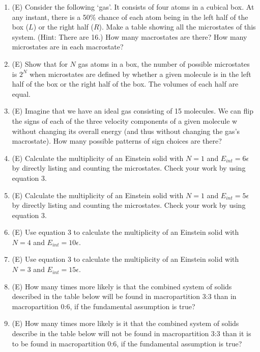 \begin{enumerate}

\item(E) Consider the following `gas'.
It consists of four atoms in a cubical box. At any instant, there is a 50\% chance
of each atom being in the left half of the box ($L$) or the right half ($R$).
Make a table showing all the microstates of this system. (Hint: There are 16.)
How many macrostates are there?
How many microstates are in each macrostate?

\item (E) Show that for $N$ gas atoms in a box, the number of possible microstates is
$2^N$ when microstates are defined by whether a given molecule is in the left half
of the box or the right half of the box.
The volumes of each half are equal.


\item (E) Imagine that we have an ideal gas consisting of 15 molecules.  
We can flip the signs of each of the three velocity components of a given molecule w
without changing its overall energy (and thus without changing the gas's macrostate).  
How many possible patterns of sign choices are there?

\item (E) Calculate the multiplicity of an Einstein solid with $N = 1$ and $E_{int} = 6\epsilon$ 
by directly listing and counting the microstates.  
Check your work by using equation 3.

\item (E) Calculate the multiplicity of an Einstein solid with $N = 1$ and 
$E_{int} = 5\epsilon$  by directly listing and counting the microstates.  
Check your work by using equation 3.

\item (E) Use equation 3 to calculate the multiplicity of an 
Einstein solid with $N = 4$ and $E_{int} = 10\epsilon$.

\item (E) Use equation 3 to calculate the multiplicity of an 
Einstein solid with $N = 3$ and $E_{int} = 15\epsilon$.

\item (E) How many times more likely is that the combined system of 
solids described in the table below will be found in macropartition 3:3 than 
in macropartition 0:6, if the fundamental assumption is true?

\item (E) How many times more likely is it that the combined system of 
solids describe in the table below will not be found in macropartition 3:3 
than it is to be found in macropartition 0:6, if the fundamental assumption is true?


\end{enumerate}
